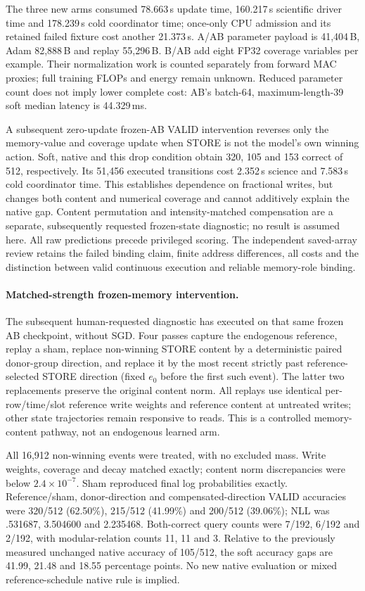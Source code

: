 The three new arms consumed 78.663\,s update time, 160.217\,s scientific
driver time and 178.239\,s cold coordinator time; once-only CPU admission
and its retained failed fixture cost another 21.373\,s. A/AB parameter
payload is 41,404\,B, Adam 82,888\,B and replay 55,296\,B. B/AB add eight
FP32 coverage variables per example. Their normalization work is counted
separately from forward MAC proxies; full training FLOPs and energy remain
unknown. Reduced parameter count does not imply lower complete cost:
AB's batch-64, maximum-length-39 soft median latency is 44.329\,ms.

A subsequent zero-update frozen-AB VALID intervention reverses only the
memory-value and coverage update when STORE is not the model's own winning
action. Soft, native and this drop condition obtain 320, 105 and 153 correct
of 512, respectively. Its 51,456 executed transitions cost 2.352\,s science
and 7.583\,s cold coordinator time. This establishes dependence on fractional
writes, but changes both content and numerical coverage and cannot additively
explain the native gap. Content permutation and intensity-matched
compensation are a separate, subsequently requested frozen-state diagnostic;
no result is assumed here. All raw predictions precede privileged scoring.
The independent saved-array review retains the failed binding claim,
finite address differences, all costs and the distinction between valid
continuous execution and reliable memory-role binding.


\paragraph{Matched-strength frozen-memory intervention.}
The subsequent human-requested diagnostic has executed on that same frozen
AB checkpoint, without SGD. Four passes capture the endogenous reference,
replay a sham, replace non-winning STORE content by a deterministic paired
donor-group direction, and replace it by the most recent strictly past
reference-selected STORE direction (fixed $e_0$ before the first such event).
The latter two replacements preserve the original content norm. All replays
use identical per-row/time/slot reference write weights and reference content
at untreated writes; other state trajectories remain responsive to reads.
This is a controlled memory-content pathway, not an endogenous learned arm.

All 16,912 non-winning events were treated, with no excluded mass. Write
weights, coverage and decay matched exactly; content norm discrepancies
were below $2.4\times10^{-7}$. Sham reproduced final log probabilities
exactly. Reference/sham, donor-direction and compensated-direction VALID
accuracies were 320/512 (62.50\%), 215/512 (41.99\%) and 200/512
(39.06\%); NLL was .531687, 3.504600 and 2.235468. Both-correct query
counts were 7/192, 6/192 and 2/192, with modular-relation counts 11, 11 and
3. Relative to the previously measured unchanged native accuracy of
105/512, the soft accuracy gaps are 41.99, 21.48 and 18.55 percentage points.
No new native evaluation or mixed reference-schedule native rule is implied.

